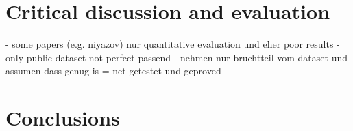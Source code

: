 \documentclass[runningheads,a4paper]{llncs}
\begin{document}
\cite{niyazov2021content}

\section{Critical discussion and evaluation}

- some papers (e.g. niyazov) nur quantitative evaluation und eher poor results 
- only public dataset not perfect passend 
- nehmen nur bruchtteil vom dataset und assumen dass genug is = net getestet und geproved 

\section{Conclusions}





\end{document}
